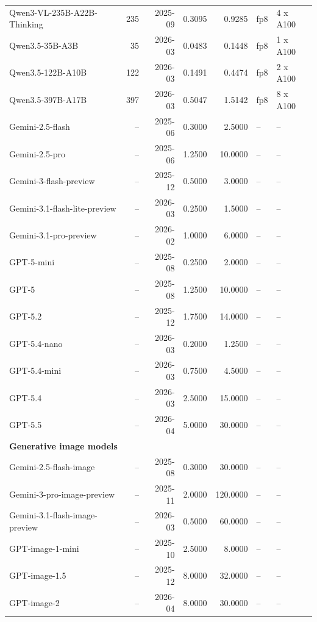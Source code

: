 \begin{table}[]
\begin{tabular}{lrrrrll}
Qwen3-VL-235B-A22B-Thinking & 235 & 2025-09 & 0.3095 & 0.9285 & fp8 & 4 x A100 \\
Qwen3.5-35B-A3B & 35 & 2026-03 & 0.0483 & 0.1448 & fp8 & 1 x A100 \\
Qwen3.5-122B-A10B & 122 & 2026-03 & 0.1491 & 0.4474 & fp8 & 2 x A100 \\
Qwen3.5-397B-A17B & 397 & 2026-03 & 0.5047 & 1.5142 & fp8 & 8 x A100 \\
Gemini-2.5-flash & -- & 2025-06 & 0.3000 & 2.5000 & -- & -- \\
Gemini-2.5-pro & -- & 2025-06 & 1.2500 & 10.0000 & -- & -- \\
Gemini-3-flash-preview & -- & 2025-12 & 0.5000 & 3.0000 & -- & -- \\
Gemini-3.1-flash-lite-preview & -- & 2026-03 & 0.2500 & 1.5000 & -- & -- \\
Gemini-3.1-pro-preview & -- & 2026-02 & 1.0000 & 6.0000 & -- & -- \\
GPT-5-mini & -- & 2025-08 & 0.2500 & 2.0000 & -- & -- \\
GPT-5 & -- & 2025-08 & 1.2500 & 10.0000 & -- & -- \\
GPT-5.2 & -- & 2025-12 & 1.7500 & 14.0000 & -- & -- \\
GPT-5.4-nano & -- & 2026-03 & 0.2000 & 1.2500 & -- & -- \\
GPT-5.4-mini & -- & 2026-03 & 0.7500 & 4.5000 & -- & -- \\
GPT-5.4 & -- & 2026-03 & 2.5000 & 15.0000 & -- & -- \\
GPT-5.5 & -- & 2026-04 & 5.0000 & 30.0000 & -- & -- \\
\midrule
\multicolumn{7}{l}{\textbf{Generative image models}} \\
\midrule
Gemini-2.5-flash-image & -- & 2025-08 & 0.3000 & 30.0000 & -- & -- \\
Gemini-3-pro-image-preview & -- & 2025-11 & 2.0000 & 120.0000 & -- & -- \\
Gemini-3.1-flash-image-preview & -- & 2026-03 & 0.5000 & 60.0000 & -- & -- \\
GPT-image-1-mini & -- & 2025-10 & 2.5000 & 8.0000 & -- & -- \\
GPT-image-1.5 & -- & 2025-12 & 8.0000 & 32.0000 & -- & -- \\
GPT-image-2 & -- & 2026-04 & 8.0000 & 30.0000 & -- & -- \\
\bottomrule
\end{tabular}
\normalsize

\end{table}